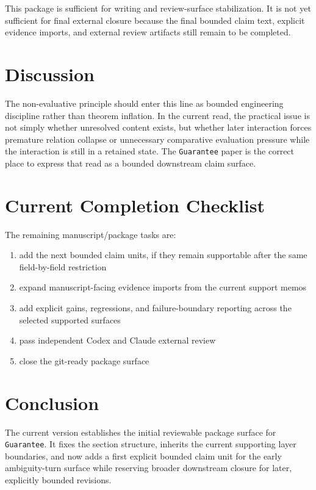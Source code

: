 \documentclass[11pt]{article}
\begin{document}
This package is sufficient for writing and review-surface stabilization. It is not
yet sufficient for final external closure because the final bounded claim text,
explicit evidence imports, and external review artifacts still remain to be
completed.

\section{Discussion}

The non-evaluative principle should enter this line as bounded engineering
discipline rather than theorem inflation. In the current read, the practical issue
is not simply whether unresolved content exists, but whether later interaction
forces premature relation collapse or unnecessary comparative evaluation pressure
while the interaction is still in a retained state. The \texttt{Guarantee} paper is
the correct place to express that read as a bounded downstream claim surface.

\section{Current Completion Checklist}

The remaining manuscript/package tasks are:
\begin{enumerate}
\item add the next bounded claim units, if they remain supportable after the same
field-by-field restriction
\item expand manuscript-facing evidence imports from the current support memos
\item add explicit gains, regressions, and failure-boundary reporting across the
selected supported surfaces
\item pass independent Codex and Claude external review
\item close the git-ready package surface
\end{enumerate}

\section{Conclusion}

The current version establishes the initial reviewable package surface for
\texttt{Guarantee}. It fixes the section structure, inherits the current supporting
layer boundaries, and now adds a first explicit bounded claim unit for the early
ambiguity-turn surface while reserving broader downstream closure for later,
explicitly bounded revisions.
\end{document}
